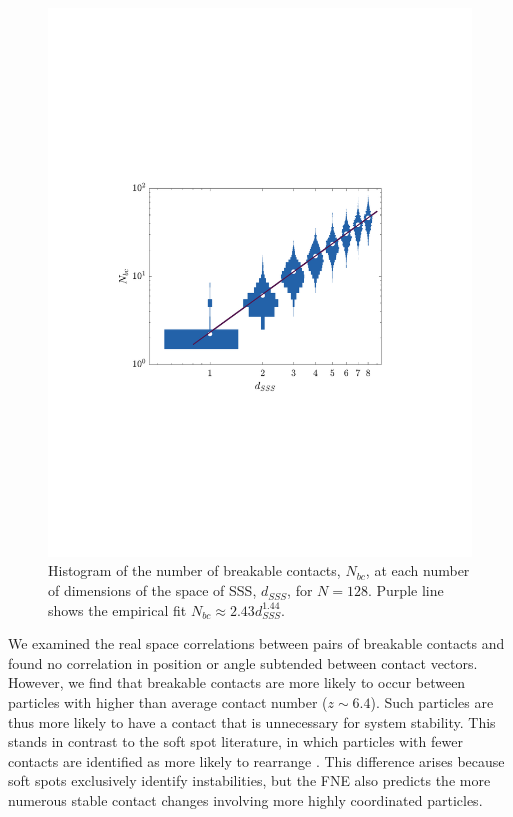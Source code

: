 \begin{figure}[t!]
\includegraphics[width=\columnwidth, trim=103 239 130 252, clip]{contactBreakingPaper/numBreakable.pdf}
\caption{Histogram of the number of breakable contacts, $N_{bc}$, at each number of dimensions of the space of SSS, $d_{SSS}$, for $N=128$. %
Purple line shows the empirical fit  $N_{bc} \approx 2.43d_{SSS}^{1.44}$.}
\label{plot:numBreakable}
\end{figure}

We examined the real space correlations between pairs of breakable contacts and found no correlation in position or angle subtended between contact vectors. However, we find that breakable contacts are more likely to occur between particles with higher than average contact number ($z\sim6.4$). Such particles are thus more likely to have a contact that is unnecessary for system stability. This stands in contrast to the soft spot literature, in which particles with fewer contacts are identified as more likely to rearrange \cite{manning_vibrational_2011,ridout_correlation_2020,rocks_learning-based_2021,richard_predicting_2020}. This difference arises because soft spots exclusively identify instabilities, but the FNE also predicts the more numerous stable contact changes involving more highly coordinated particles.


